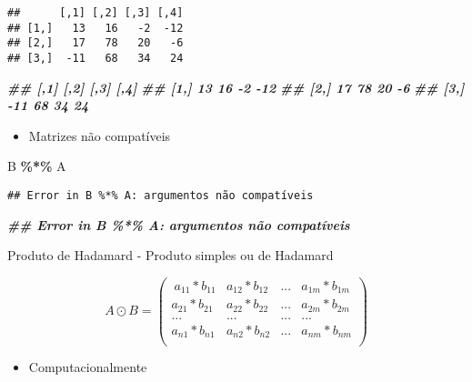 \documentclass[
]{article}
\newenvironment{Shaded}{\begin{snugshade}}{\end{snugshade}}
\newcommand{\DocumentationTok}[1]{\textcolor[rgb]{0.56,0.35,0.01}{\textbf{\textit{#1}}}}
\newcommand{\NormalTok}[1]{#1}
\newcommand{\SpecialCharTok}[1]{\textcolor[rgb]{0.81,0.36,0.00}{\textbf{#1}}}
\providecommand{\tightlist}{%
  \setlength{\itemsep}{0pt}\setlength{\parskip}{0pt}}
\begin{document}
\begin{verbatim}
##      [,1] [,2] [,3] [,4]
## [1,]   13   16   -2  -12
## [2,]   17   78   20   -6
## [3,]  -11   68   34   24
\end{verbatim}

\begin{Shaded}
\begin{Highlighting}[]
\DocumentationTok{\#\# [,1] [,2] [,3] [,4]}
\DocumentationTok{\#\# [1,] 13 16 {-}2 {-}12}
\DocumentationTok{\#\# [2,] 17 78 20 {-}6}
\DocumentationTok{\#\# [3,] {-}11 68 34 24}
\end{Highlighting}
\end{Shaded}

\begin{itemize}
\tightlist
\item
  Matrizes não compatíveis
\end{itemize}

\begin{Shaded}
\begin{Highlighting}[]
\NormalTok{B }\SpecialCharTok{\%*\%}\NormalTok{ A}
\end{Highlighting}
\end{Shaded}

\begin{verbatim}
## Error in B %*% A: argumentos não compatíveis
\end{verbatim}

\begin{Shaded}
\begin{Highlighting}[]
\DocumentationTok{\#\# Error in B \%*\% A: argumentos não compatíveis}
\end{Highlighting}
\end{Shaded}

Produto de Hadamard - Produto simples ou de Hadamard

\[A \odot B = \begin{pmatrix}\
a_{11}*b_{11} & a_{12}*b_{12} & ... & a_{1m}*b_{1m}\\
a_{21}*b_{21} & a_{22}*b_{22} & ... & a_{2m}*b_{2m}\\
... & ... & ... & ... \\
a_{n1}*b_{n1} & a_{n2}*b_{n2} & ... & a_{nm}*b_{nm}\\
\end{pmatrix}\]

\begin{itemize}
\tightlist
\item
  Computacionalmente
\end{itemize}
\end{document}
